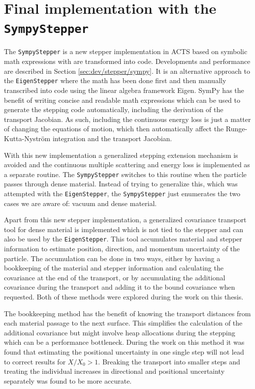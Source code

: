 \section{Final implementation with the \texttt{SympyStepper}}
\label{sec:dev/dense/sympy}

The \texttt{SympyStepper} is a new stepper implementation in ACTS based on symbolic math expressions with are transformed into code. Developments and performance are described in Section \ref{sec:dev/stepper/sympy}. It is an alternative approach to the \texttt{EigenStepper} where the math has been done first and then manually transcribed into code using the linear algebra framework Eigen. SymPy has the benefit of writing concise and readable math expressions which can be used to generate the stepping code automatically, including the derivation of the transport Jacobian. As such, including the continuous energy loss is just a matter of changing the equations of motion, which then automatically affect the Runge-Kutta-Nyström integration and the transport Jacobian.

With this new implementation a generalized stepping extension mechanism is avoided and the continuous multiple scattering and energy loss is implemented as a separate routine. The \texttt{SympyStepper} switches to this routine when the particle passes through dense material. Instead of trying to generalize this, which was attempted with the \texttt{EigenStepper}, the \texttt{SympyStepper} just enumerates the two cases we are aware of: vacuum and dense material.

Apart from this new stepper implementation, a generalized covariance transport tool for dense material is implemented which is not tied to the stepper and can also be used by the \texttt{EigenStepper}. This tool accumulates material and stepper information to estimate position, direction, and momentum uncertainty of the particle. The accumulation can be done in two ways, either by having a bookkeeping of the material and stepper information and calculating the covariance at the end of the transport, or by accumulating the additional covariance during the transport and adding it to the bound covariance when requested. Both of these methods were explored during the work on this thesis.

The bookkeeping method has the benefit of knowing the transport distances from each material passage to the next surface. This simplifies the calculation of the additional covariance but might involve heap allocations during the stepping which can be a performance bottleneck. During the work on this method it was found that estimating the positional uncertainty in one single step will not lead to correct results for $X/X_0 > 1$. Breaking the transport into smaller steps and treating the individual increases in directional and positional uncertainty separately was found to be more accurate.

